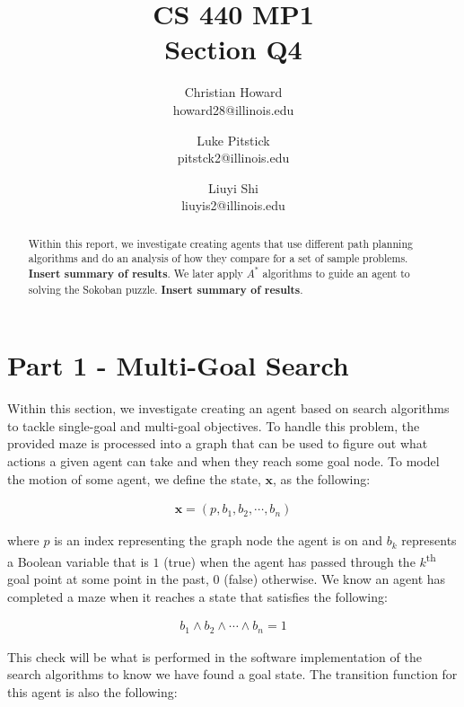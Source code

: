\documentclass{article}[12pt]
\title{CS 440 MP1 \\ Section Q4}
\author{
Christian Howard \\ howard28@illinois.edu
\and
Luke Pitstick \\ pitstck2@illinois.edu
\and
Liuyi Shi \\ liuyis2@illinois.edu
}
\date{} %
\begin{document}
   
   \maketitle
   \begin{abstract}
   Within this report, we investigate creating agents that use different path planning algorithms and do an analysis of how they compare for a set of sample problems. \textbf{Insert summary of results}. We later apply $A^*$ algorithms to guide an agent to solving the  Sokoban puzzle. \textbf{Insert summary of results}.
   \end{abstract}
   \newpage
   
   \tableofcontents
   \newpage
   
   \section{Part 1 - Multi-Goal Search}
   Within this section, we investigate creating an agent based on search algorithms to tackle single-goal and multi-goal objectives. To handle this problem, the provided maze is processed into a graph that can be used to figure out what actions a given agent can take and when they reach some goal node. To model the motion of some agent, we define the state, $\boldsymbol{x}$, as the following:  
   
   \begin{align*}
   \boldsymbol{x} = \left( p, b_1, b_2, \cdots, b_n \right)
   \end{align*}
   
   where $p$ is an index representing the graph node the agent is on and $b_k$ represents a Boolean variable that is $1$ (true) when the agent has passed through the $k$\textsuperscript{th} goal point at some point in the past, $0$ (false) otherwise. We know an agent has completed a maze when it reaches a state that satisfies the following:
   
   \begin{align*}
   b_1 \wedge b_2 \wedge \cdots \wedge b_n = 1
   \end{align*}
   
   This check will be what is performed in the software implementation of the search algorithms to know we have found a goal state. The transition function for this agent is also the following:
   
\end{document}
